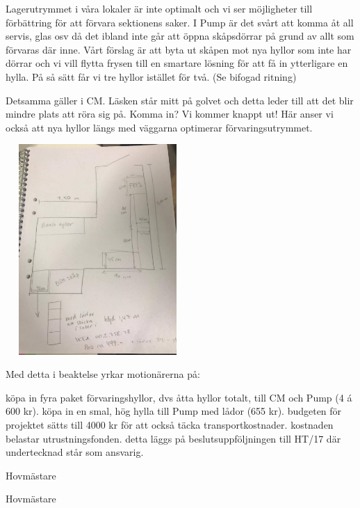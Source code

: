 \documentclass[../_main/handlingar.tex]{subfiles}
\begin{document}

Lagerutrymmet i våra lokaler är inte optimalt och vi ser möjligheter till förbättring för att förvara sektionens saker. I Pump är det svårt att komma åt all servis, glas osv då det ibland inte går att öppna skåpsdörrar på grund av allt som förvaras där inne. Vårt förslag är att byta ut skåpen mot nya hyllor som inte har dörrar och vi vill flytta frysen till en smartare lösning för att få in ytterligare en hylla. På så sätt får vi tre hyllor istället för två. (Se bifogad ritning)

Detsamma gäller i CM. Läsken står mitt på golvet och detta leder till att det blir mindre plats att röra sig på. Komma in? Vi kommer knappt ut! Här anser vi också att nya hyllor längs med väggarna optimerar förvaringsutrymmet.

\begin{center}
\includegraphics[width=7cm,height=8cm]{lager.png}
\end{center}

Med detta i beaktelse yrkar motionärerna på:
\begin{attsatser}
    \att köpa in fyra paket förvaringshyllor, dvs åtta hyllor totalt, till CM och Pump (4 á 600 kr).
    \att köpa in en smal, hög hylla till Pump med lådor (655 kr).
    \att budgeten för projektet sätts till 4000 kr för att också täcka transportkostnader.
    \att kostnaden belastar utrustningsfonden.
    \att detta läggs på beslutsuppföljningen till HT/17 där undertecknad står som ansvarig.
\end{attsatser}

\begin{signatures}{2}
    \mvh
    \signature{Sanna Nordberg}{Hovmästare}
    \signature{Matilda Dahlström}{Hovmästare}
\end{signatures}
\end{document}
